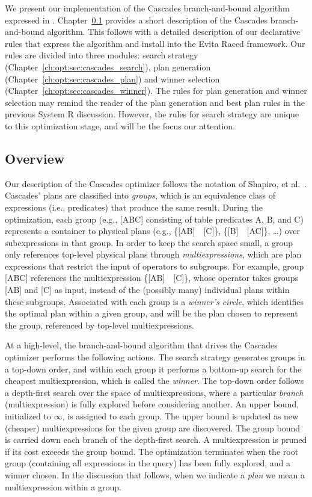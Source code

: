 We present our implementation of the Cascades branch-and-bound algorithm
expressed in \OVERLOG.  Chapter~\ref{ch:opt:sec:overview} provides a short
description of the Cascades branch-and-bound algorithm.  This follows with a
detailed description of our declarative rules that express the algorithm and
install into the Evita Raced framework.  Our rules are divided into three
modules: search strategy (Chapter~\ref{ch:opt:sec:cascades_search}), plan
generation (Chapter~\ref{ch:opt:sec:cascades_plan}) and winner selection
(Chapter~\ref{ch:opt:sec:cascades_winner}).  The rules for plan generation and
winner selection may remind the reader of the plan generation and best plan
rules in the previous System R discussion.  However, the rules for search
strategy are unique to this optimization stage, and will be the focus our
attention.

\subsection{Overview}
\label{ch:opt:sec:overview}

Our description of the Cascades optimizer follows the notation of Shapiro, et
al.~\cite{Shapiro-opt}.  Cascades' plans are classified into {\em groups},
which is an equivalence class of expressions (i.e., predicates) that produce
the same result.  During the optimization, each group (e.g., [ABC] consisting
of table predicates A, B, and C) represents a container to physical plans
(e.g., \{[AB]~~[C]\}, \{[B]~~[AC]\},
\ldots) over subexpressions in that group.  In order to keep the search space
small, a group only references top-level physical plans through {\em
multiexpressions}, which are plan expressions that restrict the input of
operators to subgroups.  For example, group [ABC] references the
multiexpression \{[AB]~~[C]\}, whose 
operator takes groups [AB] and [C] as input, instead of the (possibly many)
individual plans within these subgroups.
Associated with each group is a {\em winner's circle}, which identifies the
optimal plan within a given group, and will be the plan chosen to represent the
group, referenced by top-level multiexpressions.  

At a high-level, the branch-and-bound algorithm that drives the Cascades
optimizer performs the following actions.  The search strategy generates groups
in a top-down order, and within each group it performs a bottom-up search for
the cheapest multiexpression, which is called the {\em winner}.  The top-down
order follows a depth-first search over the space of multiexpressions, where a
particular {\em branch} (multiexpression) is fully explored before considering
another.  An upper bound, initialized to $\infty$, is assigned to each group.
The upper bound is updated as new (cheaper) multiexpressions for the given
group are discovered.  The group bound is carried down each branch of the
depth-first search.  A multiexpression is pruned if its cost exceeds the group
bound.  The optimization terminates when the root group (containing all
expressions in the query) has been fully explored, and a winner chosen.  In the
discussion that follows, when we indicate a {\em plan} we mean a
multiexpression within a group.

